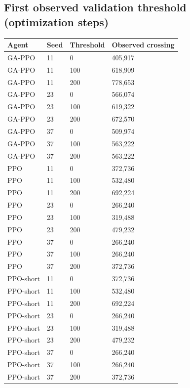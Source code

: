 \documentclass[11pt,a4paper]{article}
\begin{document}
\subsection*{First observed validation threshold (optimization steps)}
\begingroup\small
\begin{longtable}{p{}p{}p{}p{}}
\toprule
Agent & Seed & Threshold & Observed crossing \\
\midrule\endhead
GA-PPO & 11 & 0 & 405,917 \\
GA-PPO & 11 & 100 & 618,909 \\
GA-PPO & 11 & 200 & 778,653 \\
GA-PPO & 23 & 0 & 566,074 \\
GA-PPO & 23 & 100 & 619,322 \\
GA-PPO & 23 & 200 & 672,570 \\
GA-PPO & 37 & 0 & 509,974 \\
GA-PPO & 37 & 100 & 563,222 \\
GA-PPO & 37 & 200 & 563,222 \\
PPO & 11 & 0 & 372,736 \\
PPO & 11 & 100 & 532,480 \\
PPO & 11 & 200 & 692,224 \\
PPO & 23 & 0 & 266,240 \\
PPO & 23 & 100 & 319,488 \\
PPO & 23 & 200 & 479,232 \\
PPO & 37 & 0 & 266,240 \\
PPO & 37 & 100 & 266,240 \\
PPO & 37 & 200 & 372,736 \\
PPO-short & 11 & 0 & 372,736 \\
PPO-short & 11 & 100 & 532,480 \\
PPO-short & 11 & 200 & 692,224 \\
PPO-short & 23 & 0 & 266,240 \\
PPO-short & 23 & 100 & 319,488 \\
PPO-short & 23 & 200 & 479,232 \\
PPO-short & 37 & 0 & 266,240 \\
PPO-short & 37 & 100 & 266,240 \\
PPO-short & 37 & 200 & 372,736 \\
\bottomrule\end{longtable}
\endgroup
\end{document}
